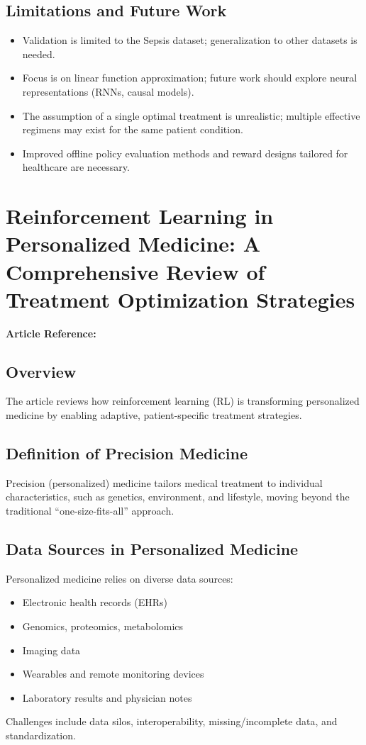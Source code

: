 \subsection*{Limitations and Future Work}
\begin{itemize}
    \item Validation is limited to the Sepsis dataset; generalization to other datasets is needed.
    \item Focus is on linear function approximation; future work should explore neural representations (RNNs, causal models).
    \item The assumption of a single optimal treatment is unrealistic; multiple effective regimens may exist for the same patient condition.
    \item Improved offline policy evaluation methods and reward designs tailored for healthcare are necessary.
\end{itemize}


\section{Reinforcement Learning in Personalized Medicine: A Comprehensive Review of Treatment Optimization Strategies}
\textbf{Article Reference:} \cite{banumathiReinforcementLearningPersonalized2025}
\subsection*{Overview}
The article reviews how reinforcement learning (RL) is transforming personalized medicine by enabling adaptive, patient-specific treatment strategies.

\subsection*{Definition of Precision Medicine}
Precision (personalized) medicine tailors medical treatment to individual characteristics, such as genetics, environment, and lifestyle, moving beyond the traditional “one-size-fits-all” approach.

\subsection*{Data Sources in Personalized Medicine}
Personalized medicine relies on diverse data sources:
\begin{itemize}
    \item Electronic health records (EHRs)
    \item Genomics, proteomics, metabolomics
    \item Imaging data
    \item Wearables and remote monitoring devices
    \item Laboratory results and physician notes
\end{itemize}
Challenges include data silos, interoperability, missing/incomplete data, and standardization.


